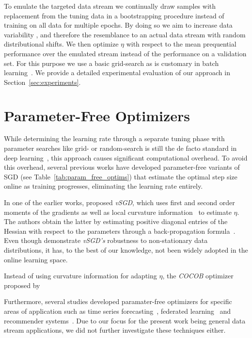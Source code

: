 \documentclass[letterpaper]{article} %
\begin{document}
To emulate
the targeted data stream we continually draw samples with replacement from the tuning data in a bootstrapping procedure instead of training on all data for multiple epochs.
By doing so we aim to increase data variability%
, and therefore the resemblance to an actual data stream with random distributional shifts.
We then optimize $\eta$ with respect to the mean prequential performance over the emulated stream instead of the performance on a validation set.
For this purpose we use a basic grid-search as is customary in batch learning~\cite{defazioLearningRateFreeLearningDAdaptation2023a}.
We provide a detailed experimental evaluation of our approach in Section~\ref{sec:experiments}.


\section{Parameter-Free Optimizers}

While determining the learning rate through a separate tuning phase with parameter searches like grid- or random-search is still the de facto standard in deep learning~\cite{defazioLearningRateFreeLearningDAdaptation2023a}, this approach causes significant computational overhead.
To avoid this overhead, several previous works have developed parameter-free variants of SGD (see Table~\ref{tab:param_free_optims}) that estimate the optimal step size online as training progresses, eliminating the learning rate entirely.

In one of the earlier works, \citet{schaulNoMorePesky2013} proposed \textit{vSGD}, which uses first and second order moments of the gradients as well as local curvature information~\cite{schaulNoMorePesky2013} to estimate $\eta$.
The authors obtain the latter by estimating positive diagonal entries of the Hessian with respect to the parameters through a back-propagation formula~\cite{schaulNoMorePesky2013}.
Even though \citet{schaulNoMorePesky2013} demonstrate \textit{vSGD's} robustness to non-stationary data distributions, it has, to the best of our knowledge, not been widely adopted in the online learning space. 

Instead of using curvature information for adapting $\eta$, the \textit{COCOB} optimizer proposed by \citet{orabonaTrainingDeepNetworks2017} 


Furthermore, several studies developed paramater-free optimizers for specific areas of application such as time series forecasting~\cite{miyaguchiCograConceptDriftAwareStochastic2019,fekriDeepLearningLoad2021, zhangPOLAOnlineTime2021a}, federated learning~\cite{canonacoAdaptiveFederatedLearning2021} and recommender systems~\cite{ferreirajoseADADRIFTAdaptiveLearning2020}.
Due to our focus for the present work being general data stream applications, we did not further investigate these techniques either.
\end{document}
